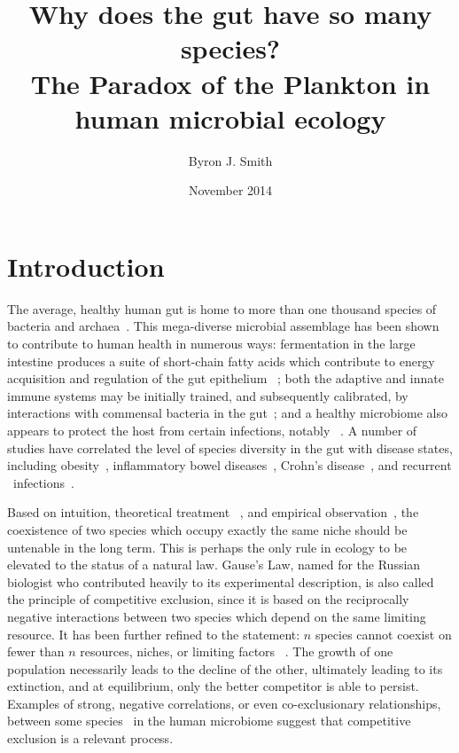 \documentclass[12pt]{article}
\begin{document}
\title{\huge Why does the gut have so many species? \\
       {\Large The Paradox of the Plankton in human microbial ecology}}
\author{Byron J. Smith}
\date{November 2014}
\maketitle

\section{Introduction}
The average, healthy human gut is home to more than one thousand species of
bacteria and archaea~\citep{Claesson2009,Brestoff2013}.
This mega-diverse microbial assemblage has been shown to contribute to human
health in numerous ways:
fermentation in the large intestine produces a suite of short-chain fatty acids
which contribute to energy acquisition and regulation of the gut epithelium~%
\citep{Macfarlane2012};
both the adaptive and innate immune systems may be initially trained,
and subsequently calibrated,
by interactions with commensal bacteria in the gut~\citep{Brestoff2013};
and a healthy microbiome also appears to protect the host from certain
infections, notably \cdiff~\citep{Britton2012}.
A number of studies have correlated the level of species diversity in the gut
with disease states,
including obesity~\citep{Turnbaugh2008,LeChatelier2013},
inflammatory bowel diseases~\citep{Dicksved2008},
Crohn's disease~\citep{Manichanh2006},
and recurrent \cdiff\ infections~\citep{Chang2008}.

Based on intuition, theoretical treatment%
~\citep{Lotka1925,Volterra1928,MacArthur1967a},
and empirical observation~\citep{Gause1932,Gause1936},
the coexistence of two species which occupy
exactly the same niche should be untenable in the long term.
This is perhaps the only rule in ecology to be elevated to the
status of a natural law.
Gause's Law, named for the Russian biologist who contributed
heavily to its experimental description, is also called
the principle of competitive exclusion, since it is based on
the reciprocally negative interactions between two species which
depend on the same limiting resource.
It has been further refined to the statement: \(n\) species cannot coexist on
fewer than \(n\) resources, niches, or limiting factors%
~\citep[various authors, for a review see][]{Armstrong1980}.
The growth of one population necessarily leads to the decline of
the other, ultimately leading to its extinction,
and at equilibrium, only the better competitor is able to persist.
Examples of strong, negative correlations,
or even co-exclusionary relationships,
between some species~\citep{Faust2012a} in the human microbiome
suggest that competitive exclusion is a relevant process.
\end{document}
